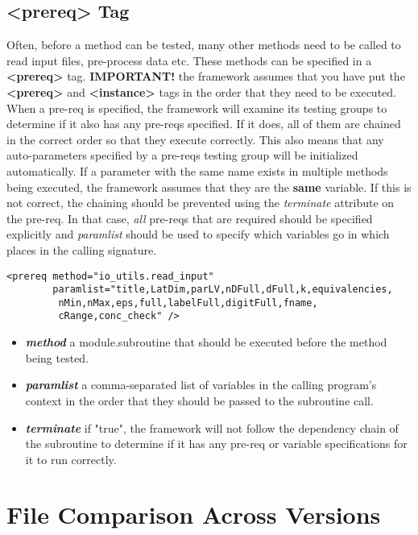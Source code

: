 \documentclass[paper=a4, fontsize=11pt]{scrartcl} %
\numberwithin{equation}{section} %
\numberwithin{figure}{section} %
\numberwithin{table}{section} %
\begin{document}
\subsection{<prereq> Tag}

Often, before a method can be tested, many other methods need to be called to read input files, pre-process
data etc. These methods can be specified in a \textbf{<prereq>} tag. \textbf{IMPORTANT!} the framework assumes
that you have put the \textbf{<prereq>} and \textbf{<instance>} tags in the order that they need to be
executed. \\

When a pre-req is specified, the framework will examine its testing groups to determine if it also has any
pre-reqs specified. If it does, all of them are chained in the correct order so that they execute correctly.
This also means that any auto-parameters specified by a pre-reqs testing group will be initialized
automatically. If a parameter with the same name exists in multiple methods being executed, the framework
assumes that they are the \textbf{same} variable. If this is not correct, the chaining should be prevented
using the \textit{terminate} attribute on the pre-req. In that case, \textit{all} pre-reqs that are required
should be specified explicitly and \textit{paramlist} should be used to specify which variables go in
which places in the calling signature.

\begin{lstlisting}
<prereq method="io_utils.read_input" 
        paramlist="title,LatDim,parLV,nDFull,dFull,k,equivalencies,
		 nMin,nMax,eps,full,labelFull,digitFull,fname,
		 cRange,conc_check" />
\end{lstlisting}

\begin{itemize}
\item \textbf{\textit{method}} a module.subroutine that should be executed before the method being tested.
\item \textbf{\textit{paramlist}} a comma-separated list of variables in the calling program's context in
the order that they should be passed to the subroutine call.
\item \textbf{\textit{terminate}} if "true", the framework will not follow the dependency chain of the
subroutine to determine if it has any pre-req or variable specifications for it to run correctly.
\end{itemize}

\section{File Comparison Across Versions}
\end{document}
